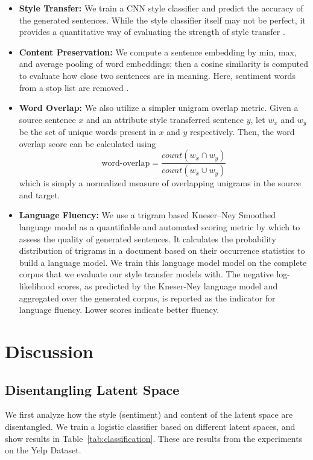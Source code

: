 \documentclass[11pt,a4paper]{article}
\begin{document}
\begin{itemize}
	\item \textbf{Style Transfer:} We train a CNN style classifier \cite{kim2014convolutional} and predict the accuracy of the generated sentences. While the style classifier itself may not be perfect, it provides a quantitative way of evaluating the strength of style transfer \cite{hu2017toward,shen2017style,fu2017style}.
	\item \textbf{Content Preservation:} We compute a sentence embedding by min, max, and average pooling of word embeddings; then a cosine similarity is computed to evaluate how close two sentences are in meaning. Here, sentiment words from a stop list \cite{hu2004mining} are removed \cite{fu2017style}.
	\item \textbf{Word Overlap:} We also utilize a simpler unigram overlap metric. Given a source sentence $x$ and an attribute style transferred sentence $y$, let $w_x$ and $w_y$ be the set of unique words present in $x$ and $y$ respectively. Then, the word overlap score can be calculated using $$\text{word-overlap} = \frac{count(w_x \cap w_y)}{count(w_x \cup w_y)}$$ which is simply a normalized measure of overlapping unigrams in the source and target.
	\item \textbf{Language Fluency:} We use a trigram based Kneser–Ney Smoothed language model \citep{kneser1995improved} as a quantifiable and automated scoring metric by which to assess the quality of generated sentences. It calculates the probability distribution of trigrams in a document based on their occurrence statistics to build a language model. We train this language model model on the complete corpus that we evaluate our style transfer models with. The negative log-likelihood scores, as predicted by the Kneser-Ney language model and aggregated over the generated corpus, is reported as the indicator for language fluency. Lower scores indicate better fluency.
\end{itemize}


\section{Discussion}

\subsection{Disentangling Latent Space}

We first analyze how the style (sentiment) and content of the latent space are disentangled. We train a logistic classifier based on different latent spaces, and show results in Table~\ref{tab:classification}. These are results from the experiments on the Yelp Dataset.
\end{document}
